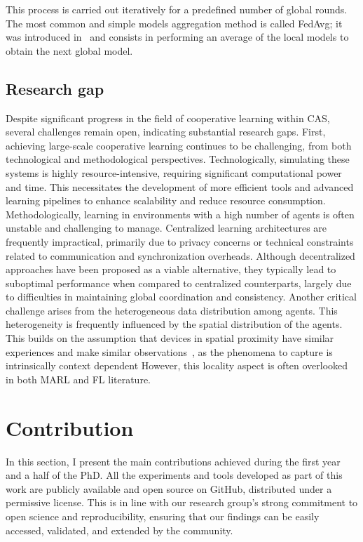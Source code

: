 \documentclass[12pt]{article}
\begin{document}
%
This process is carried out iteratively for a predefined number of global rounds. The most common and simple models
 aggregation method is called FedAvg; it was introduced in~\cite{DBLP:conf/aistats/McMahanMRHA17}
 and consists in performing an average of the local models to obtain the next global model.

\subsection{Research gap}

Despite significant progress in the field of cooperative learning within CAS, 
 several challenges remain open, indicating substantial research gaps.
%
First, achieving large-scale cooperative learning continues to be challenging, from both technological 
 and methodological perspectives. 
% 
Technologically, simulating these systems is highly resource-intensive, requiring significant 
 computational power and time. 
% 
This necessitates the development of more efficient tools and advanced learning pipelines to enhance 
 scalability and reduce resource consumption.
%
Methodologically, learning in environments with a high number of agents is often unstable and challenging to manage. 
%
Centralized learning architectures are frequently impractical, primarily due to privacy concerns or technical 
 constraints related to communication and synchronization overheads. 
% 
Although decentralized approaches have been proposed as a viable alternative, they typically lead to 
 suboptimal performance when compared to centralized counterparts, largely due to difficulties in maintaining global 
 coordination and consistency.
%
Another critical challenge arises from the heterogeneous data distribution among agents.
% 
This heterogeneity is frequently influenced by the spatial distribution of the agents.
%
This builds on the assumption that devices in spatial proximity have similar experiences and make similar 
 observations~\cite{esterle2022deep}, as
 the phenomena to capture is intrinsically context dependent
% 
However, this locality aspect is often overlooked in both MARL and FL literature.


\section{Contribution}\label{sec:contribution}

In this section, I present the main contributions achieved during the first year and a half of the PhD. 
%
All the experiments and tools developed as part of this work are publicly available and open source on GitHub, 
 distributed under a permissive license. 
% 
This is in line with our research group's strong commitment to open science and reproducibility, ensuring that 
 our findings can be easily accessed, validated, and extended by the community.
\end{document}
